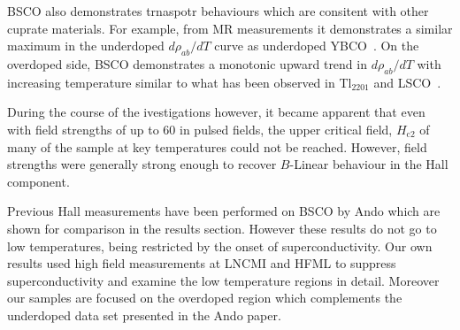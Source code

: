 \ac{BSCO} also demonstrates trnaspotr behaviours which are consitent with other \highTc cuprate materials. For example, from \ac{MR} measurements it demonstrates a similar maximum in the underdoped $d\rho_{ab}/dT$ curve as underdoped YBCO~\cite{Ando1999}. On the overdoped side, \ac{BSCO} demonstrates a monotonic upward trend in $d\rho_{ab}/dT$ with increasing temperature similar to what has been observed in Tl$_{2201}$ and \ac{LSCO}~\cite{Ando1999}.

During the course of the ivestigations however, it became apparent that even with field strengths of up to \unit{60}{\tesla} in pulsed fields, the upper critical field, $H_{\textrm{c2}}$ of many of the sample at key temperatures could not be reached. However, field strengths were generally strong enough to recover $B$-Linear behaviour in the Hall component.

Previous Hall measurements have been performed on \ac{BSCO} by Ando \etal which are shown for comparison in the results section. However these results do not go to low temperatures, being restricted by the onset of superconductivity. Our own results used high field measurements at \ac{LNCMI} and \ac{HFML} to suppress superconductivity and examine the low temperature regions in detail. Moreover our samples are focused on the overdoped region which complements the underdoped data set presented in the Ando paper.





